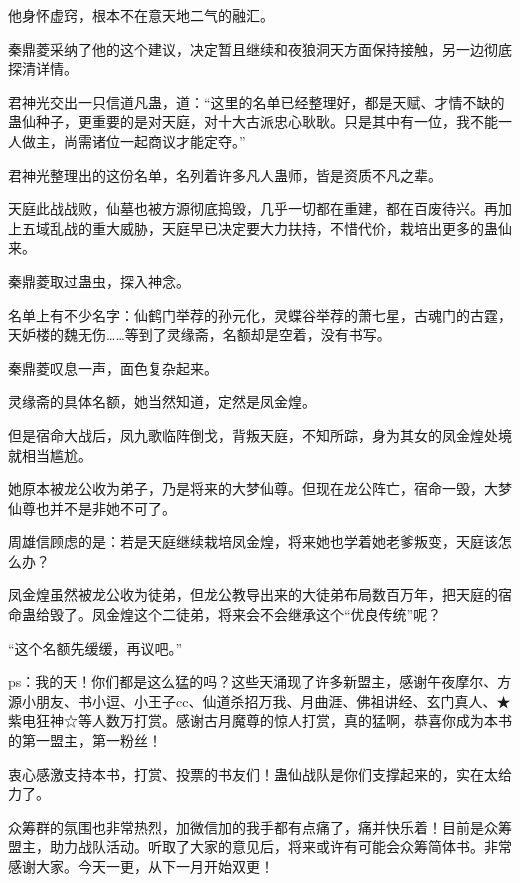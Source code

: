 \begin{this_body}
他身怀虚窍，根本不在意天地二气的融汇。

秦鼎菱采纳了他的这个建议，决定暂且继续和夜狼洞天方面保持接触，另一边彻底探清详情。

君神光交出一只信道凡蛊，道：“这里的名单已经整理好，都是天赋、才情不缺的蛊仙种子，更重要的是对天庭，对十大古派忠心耿耿。只是其中有一位，我不能一人做主，尚需诸位一起商议才能定夺。”

君神光整理出的这份名单，名列着许多凡人蛊师，皆是资质不凡之辈。

天庭此战战败，仙墓也被方源彻底捣毁，几乎一切都在重建，都在百废待兴。再加上五域乱战的重大威胁，天庭早已决定要大力扶持，不惜代价，栽培出更多的蛊仙来。

秦鼎菱取过蛊虫，探入神念。

名单上有不少名字：仙鹤门举荐的孙元化，灵蝶谷举荐的萧七星，古魂门的古霆，天妒楼的魏无伤……等到了灵缘斋，名额却是空着，没有书写。

秦鼎菱叹息一声，面色复杂起来。

灵缘斋的具体名额，她当然知道，定然是凤金煌。

但是宿命大战后，凤九歌临阵倒戈，背叛天庭，不知所踪，身为其女的凤金煌处境就相当尴尬。

她原本被龙公收为弟子，乃是将来的大梦仙尊。但现在龙公阵亡，宿命一毁，大梦仙尊也并不是非她不可了。

周雄信顾虑的是：若是天庭继续栽培凤金煌，将来她也学着她老爹叛变，天庭该怎么办？

凤金煌虽然被龙公收为徒弟，但龙公教导出来的大徒弟布局数百万年，把天庭的宿命蛊给毁了。凤金煌这个二徒弟，将来会不会继承这个“优良传统”呢？

“这个名额先缓缓，再议吧。”

ps：我的天！你们都是这么猛的吗？这些天涌现了许多新盟主，感谢午夜摩尔、方源小朋友、书小逗、小王子cc、仙道杀招万我、月曲涯、佛祖讲经、玄门真人、★紫电狂神☆等人数万打赏。感谢古月魔尊的惊人打赏，真的猛啊，恭喜你成为本书的第一盟主，第一粉丝！

衷心感激支持本书，打赏、投票的书友们！蛊仙战队是你们支撑起来的，实在太给力了。

众筹群的氛围也非常热烈，加微信加的我手都有点痛了，痛并快乐着！目前是众筹盟主，助力战队活动。听取了大家的意见后，将来或许有可能会众筹简体书。非常感谢大家。今天一更，从下一月开始双更！

\end{this_body}

